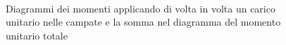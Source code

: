 \begin{figure}[p]
 \\
\caption{Diagrammi dei momenti applicando di volta in volta un carico unitario nelle campate e la somma nel diagramma del momento unitario totale}
\label{fig:MomentiUnitari}
\end{figure}
